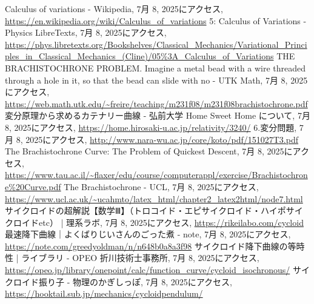 \documentclass[12pt,a4paper]{ltjsarticle}
\begin{document}
\begin{thebibliography}{99}
 Calculus of variations - Wikipedia, 7月 8, 2025にアクセス, \url{https://en.wikipedia.org/wiki/Calculus_of_variations}
 5: Calculus of Variations - Physics LibreTexts, 7月 8, 2025にアクセス, \url{https://phys.libretexts.org/Bookshelves/Classical_Mechanics/Variational_Principles_in_Classical_Mechanics_(Cline)/05%3A_Calculus_of_Variations}
 THE BRACHISTOCHRONE PROBLEM. Imagine a metal bead with a wire threaded through a hole in it, so that the bead can slide with no - UTK Math, 7月 8, 2025にアクセス, \url{https://web.math.utk.edu/~freire/teaching/m231f08/m231f08brachistochrone.pdf}
 変分原理から求めるカテナリー曲線 - 弘前大学 Home Sweet Home について, 7月 8, 2025にアクセス, \url{https://home.hirosaki-u.ac.jp/relativity/3240/}
 6.変分問題, 7月 8, 2025にアクセス, \url{http://www.nara-wu.ac.jp/core/koto/pdf/151027T3.pdf}
 The Brachistochrone Curve: The Problem of Quickest Descent, 7月 8, 2025にアクセス, \url{https://www.tau.ac.il/~flaxer/edu/course/computerappl/exercise/Brachistochrone%20Curve.pdf}
 The Brachistochrone - UCL, 7月 8, 2025にアクセス, \url{https://www.ucl.ac.uk/~ucahmto/latex_html/chapter2_latex2html/node7.html}
 サイクロイドの超解説【数学Ⅲ】（トロコイド・エピサイクロイド・ハイポサイクロイドetc） | 理系ラボ, 7月 8, 2025にアクセス, \url{https://rikeilabo.com/cycloid}
 最速降下曲線｜よくばりじいさんのごった煮 - note, 7月 8, 2025にアクセス, \url{https://note.com/greedyoldman/n/n648b0a8a3f98}
 サイクロイド降下曲線の等時性 | ライブラリ - OPEO 折川技術士事務所, 7月 8, 2025にアクセス, \url{https://opeo.jp/library/onepoint/calc/function_curve/cycloid_isochronous/}
 サイクロイド振り子 - 物理のかぎしっぽ, 7月 8, 2025にアクセス, \url{https://hooktail.sub.jp/mechanics/cycloidpendulum/}
\end{thebibliography}
\end{document}
